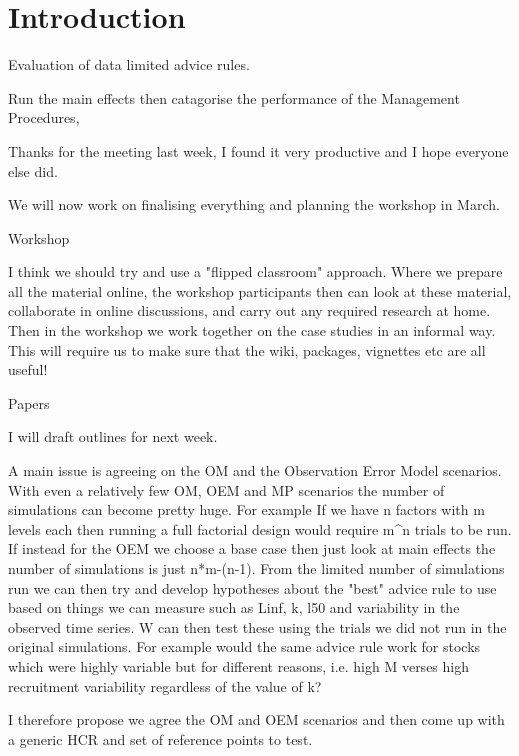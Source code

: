 \documentclass[]{article}
\date{}
\makeatletter
\def\wileyIndent{1pt}
\def\author#1{\gdef\@author{\hskip-\dimexpr(\tabcolsep)\hskip\wileyIndent\parbox{\dimexpr\textwidth-\wileyIndent}{\centering\bfseries#1}}}
\def\title#1{\gdef\@title{\centering\bfseries\ifx\@articleType\@empty\else\@articleType\\\fi#1}}
\let\@articleType\@empty \def\articletype#1{\gdef\@articleType{{\normalfont\itshape#1}}}
\makeatother
\begin{document}
\title{MyDas Generic Paper}
\author{~}

\def\RunningHead{}\def\RunningAuthor{}

\maketitle 

    
\section{Introduction}
Evaluation of data limited advice rules.

Run the main effects then catagorise the performance of the Management Procedures, 

Thanks for the meeting last week, I found it very productive and I hope everyone else did.

We will now work on finalising everything and planning the workshop in March.

Workshop

I think we should try and use a "flipped classroom" approach. Where we prepare all the material online, the workshop participants then can look at these material, collaborate in online discussions, and carry out any required research at home. Then in the workshop we work together on the case studies in an informal way. This will require us to make sure that the wiki, packages, vignettes etc are all useful!

Papers

I will draft outlines for next week.

A main issue is agreeing on the OM and the Observation Error Model scenarios. With even a relatively few OM, OEM and MP scenarios the number of simulations can become pretty huge. For example If we have n factors with m levels each then running a full factorial design would require m^n trials to be run. If instead for the OEM we choose a base case then just look at main effects the number of simulations is just n*m-(n-1).
From the limited number of simulations run we can then try and develop hypotheses about the "best" advice rule to use based on things we can measure such as Linf, k, l50 and variability in the observed time series. W can then test these using the trials we did not run in the original simulations. For example would the same advice rule work for stocks which were highly variable but for different reasons, i.e. high M verses high recruitment variability regardless of the value of k?
 
I therefore propose we agree the OM and OEM scenarios and then  come up with a generic HCR and set of reference points to test. 
\end{document}

